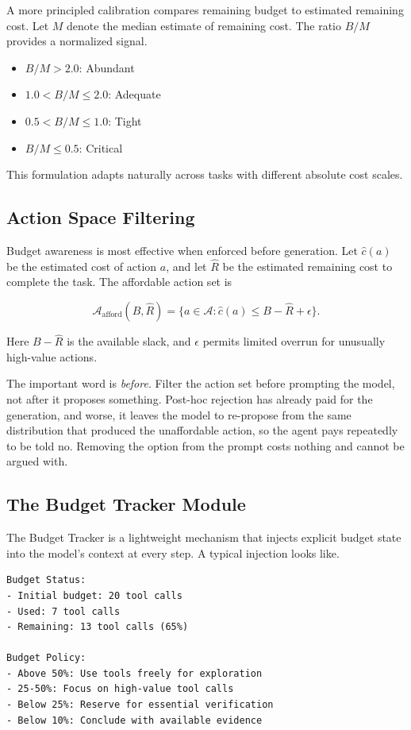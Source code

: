 A more principled calibration compares remaining budget to estimated remaining cost. Let $M$ denote the median estimate of remaining cost. The ratio $B/M$ provides a normalized signal.

\begin{itemize}
\item $B/M > 2.0$: Abundant
\item $1.0 < B/M \leq 2.0$: Adequate
\item $0.5 < B/M \leq 1.0$: Tight
\item $B/M \leq 0.5$: Critical
\end{itemize}

This formulation adapts naturally across tasks with different absolute cost scales.

\subsection{Action Space Filtering}

Budget awareness is most effective when enforced before generation. Let $\hat{c}(a)$ be the estimated cost of action $a$, and let $\hat{R}$ be the estimated remaining cost to complete the task. The affordable action set is

\[
\mathcal{A}_{\text{afford}}(B, \hat{R}) =
\{ a \in \mathcal{A} : \hat{c}(a) \leq B - \hat{R} + \epsilon \}.
\]

Here $B - \hat{R}$ is the available slack, and $\epsilon$ permits limited overrun for unusually high-value actions.

The important word is \emph{before}. Filter the action set before prompting the model, not after it proposes something. Post-hoc rejection has already paid for the generation, and worse, it leaves the model to re-propose from the same distribution that produced the unaffordable action, so the agent pays repeatedly to be told no. Removing the option from the prompt costs nothing and cannot be argued with.

\subsection{The Budget Tracker Module}

The Budget Tracker \cite{bats2025} is a lightweight mechanism that injects explicit budget state into the model’s context at every step. A typical injection looks like. \begin{verbatim}
Budget Status:
- Initial budget: 20 tool calls
- Used: 7 tool calls
- Remaining: 13 tool calls (65%)

Budget Policy:
- Above 50%: Use tools freely for exploration
- 25-50%: Focus on high-value tool calls
- Below 25%: Reserve for essential verification
- Below 10%: Conclude with available evidence
\end{verbatim}

